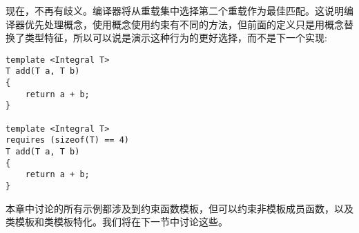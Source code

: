 现在，不再有歧义。编译器将从重载集中选择第二个重载作为最佳匹配。这说明编译器优先处理概念，使用概念使用约束有不同的方法，但前面的定义只是用概念替换了类型特征，所以可以说是演示这种行为的更好选择，而不是下一个实现:

\begin{lstlisting}[style=styleCXX]
template <Integral T>
T add(T a, T b)
{
	return a + b;
}

template <Integral T>
requires (sizeof(T) == 4)
T add(T a, T b)
{
	return a + b;
}
\end{lstlisting}

本章中讨论的所有示例都涉及到约束函数模板，但可以约束非模板成员函数，以及类模板和类模板特化。我们将在下一节中讨论这些。





























